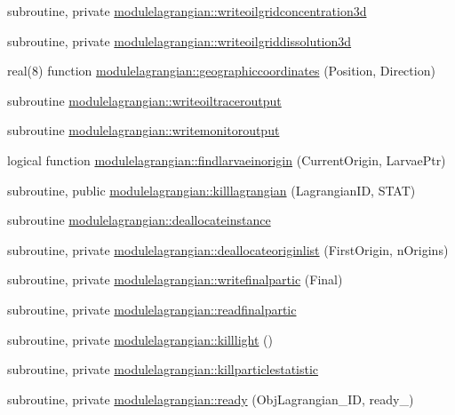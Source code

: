 \begin{DoxyCompactItemize}
subroutine, private \mbox{\hyperlink{namespacemodulelagrangian_acf6d490f27a032fae7ae0cf84c95989b}{modulelagrangian\+::writeoilgridconcentration3d}}
\item 
subroutine, private \mbox{\hyperlink{namespacemodulelagrangian_a31ce964f62f42f4eede762da9d6b5d88}{modulelagrangian\+::writeoilgriddissolution3d}}
\item 
real(8) function \mbox{\hyperlink{namespacemodulelagrangian_ad718f547ef233587149bd01b55f9e9dd}{modulelagrangian\+::geographiccoordinates}} (Position, Direction)
\item 
subroutine \mbox{\hyperlink{namespacemodulelagrangian_af05b4830d15cd47fd3ed67c7bbffda15}{modulelagrangian\+::writeoiltraceroutput}}
\item 
subroutine \mbox{\hyperlink{namespacemodulelagrangian_a34b406709c4bc499c1d075b26e741c0b}{modulelagrangian\+::writemonitoroutput}}
\item 
logical function \mbox{\hyperlink{namespacemodulelagrangian_a4a81291f0f83c4c244a6842be5d88471}{modulelagrangian\+::findlarvaeinorigin}} (Current\+Origin, Larvae\+Ptr)
\item 
subroutine, public \mbox{\hyperlink{namespacemodulelagrangian_a18d99349731a3f837e18c16f49c3743f}{modulelagrangian\+::killlagrangian}} (Lagrangian\+ID, S\+T\+AT)
\item 
subroutine \mbox{\hyperlink{namespacemodulelagrangian_a43ea933b1bd63328af5b5fde1d41787a}{modulelagrangian\+::deallocateinstance}}
\item 
subroutine, private \mbox{\hyperlink{namespacemodulelagrangian_a3f11dfb687cee81738d6fd8944750d72}{modulelagrangian\+::deallocateoriginlist}} (First\+Origin, n\+Origins)
\item 
subroutine, private \mbox{\hyperlink{namespacemodulelagrangian_a5d2088faec6c07d9907d57eacfc167ae}{modulelagrangian\+::writefinalpartic}} (Final)
\item 
subroutine, private \mbox{\hyperlink{namespacemodulelagrangian_aa8ba43a560dd11df5632a522066b74a6}{modulelagrangian\+::readfinalpartic}}
\item 
subroutine, private \mbox{\hyperlink{namespacemodulelagrangian_a2f00972bf015601fb8181bb28eb89850}{modulelagrangian\+::killlight}} ()
\item 
subroutine, private \mbox{\hyperlink{namespacemodulelagrangian_acabd7df16f5abd0459a4a8e198526f3d}{modulelagrangian\+::killparticlestatistic}}
\item 
subroutine, private \mbox{\hyperlink{namespacemodulelagrangian_a4ddfbe58c1df4477f8d84db54b330823}{modulelagrangian\+::ready}} (Obj\+Lagrangian\+\_\+\+ID, ready\+\_\+)

\end{DoxyCompactItemize}
